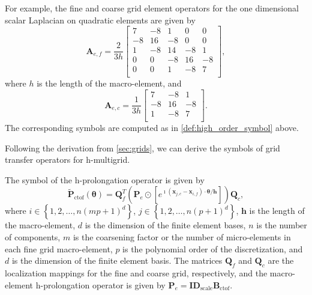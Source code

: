 \documentclass[review]{siamart190516}
\begin{document}
For example, the fine and coarse grid element operators for the one dimensional scalar Laplacian on quadratic elements are given by
\begin{equation}
\mathbf{A}_{e, f} =
\frac{2}{3h}
\begin{bmatrix}
 7  &  -8  &   1  &   0  &   0  \\
-8  &  16  &  -8  &   0  &   0  \\
 1  &  -8  &  14  &  -8  &   1  \\
 0  &   0  &  -8  &  16  &  -8  \\
 0  &   0  &   1  &  -8  &   7  \\
\end{bmatrix},
\end{equation}
where $h$ is the length of the macro-element, and
\begin{equation}
\mathbf{A}_{e, c} =
\frac{1}{3h}
\begin{bmatrix}
 7  &  -8  &   1  \\
-8  &  16  &  -8  \\
 1  &  -8  &   7  \\
\end{bmatrix}.
\end{equation}
The corresponding symbols are computed as in \cref{def:high_order_symbol} above.

Following the derivation from \cref{sec:grids}, we can derive the symbols of grid transfer operators for h-multigrid.

\begin{definition}\label{def:h_prolongation_symbol}
The symbol of the h-prolongation operator is given by
\begin{equation}
\tilde{\mathbf{P}}_{\text{ctof}} \left( \boldsymbol{\theta} \right) = \mathbf{Q}_f^T \left( \mathbf{P}_e \odot \left[ e^{\imath \left( \mathbf{x}_{j, c} - \mathbf{x}_{i, f} \right) \cdot \mathbf{\theta} / \mathbf{h}} \right] \right) \mathbf{Q}_c,
\end{equation}
where $i \in \left\lbrace 1, 2, \dots, n \left( m p + 1 \right)^d \right\rbrace$, $j \in \left\lbrace 1, 2, \dots, n \left( p + 1 \right)^d \right\rbrace$, $\mathbf{h}$ is the length of the macro-element, $d$ is the dimension of the finite element bases, $n$ is the number of components, $m$ is the coarsening factor or the number of micro-elements in each fine grid macro-element, $p$ is the polynomial order of the discretization, and $d$ is the dimension of the finite element basis.
The matrices $\mathbf{Q}_f$ and $\mathbf{Q}_c$ are the localization mappings for the fine and coarse grid, respectively, and the macro-element h-prolongation operator is given by $\mathbf{P}_e = \mathbf{I} \mathbf{D}_{\text{scale}} \mathbf{B}_{\text{ctof}}$.
\end{definition}
\end{document}
